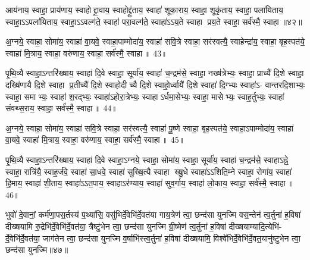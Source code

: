 {\anuvakamend[{रन्ति॒स्स्वाहा॒ द्वाविꣳ॑शतिश्च॥12॥}]}

आय॑नाय॒ स्वाहा॒ प्राय॑णाय॒ स्वाहोद्द्रा॒वाय॒ स्वाहोद्द्रु॑ताय॒ स्वाहा॑ शूका॒राय॒ स्वाहा॒ शूकृ॑ताय॒ स्वाहा॒ पला॑यिताय॒ स्वाहा॒ऽऽपला॑यिताय॒ स्वाहा॒ऽऽवल्ग॑ते॒ स्वाहा॑ परा॒वल्ग॑ते॒ स्वाहा॑ऽऽय॒ते स्वाहा प्रय॒ते स्वाहा॒ सर्व॑स्मै॒ स्वाहा॥४२॥

{\anuvakamend[{आय॑ना॒योत्त॑रमा॒पला॑यिताय॒ षड्विꣳ॑शतिः॥13॥}]}

अ॒ग्नये॒ स्वाहा॒ सोमा॑य॒ स्वाहा॑ वा॒यवे॒ स्वाहा॒पाम्मोदा॑य॒ स्वाहा॑ सवि॒त्रे स्वाहा॒ सर॑स्वत्यै॒ स्वाहेन्द्रा॑य॒ स्वाहा॒ बृह॒स्पत॑ये॒ स्वाहा॑ मि॒त्राय॒ स्वाहा॒ वरु॑णाय॒ स्वाहा॒ सर्व॑स्मै॒ स्वाहा॥ 43॥

{\anuvakamend[{}]}

पृ॒थि॒व्यै स्वाहा॒ऽन्तरि॑ख्षाय॒ स्वाहा॑ दि॒वे स्वाहा॒ सूर्या॑य॒ स्वाहा॑ च॒न्द्रम॑से॒ स्वाहा॒ नख्ष॑त्रेभ्यः॒ स्वाहा॒ प्राच्यै॑ दि॒शे स्वाहा॒ दख्षि॑णायै दि॒शे स्वाहा प्र॒तीच्यै॑ दि॒शे स्वाहोदीच्यै दि॒शे स्वाहो॒र्ध्वायै॑ दि॒शे स्वाहा॑ दि॒ग्भ्यः स्वाहा॑ऽ- वान्तरदि॒शाभ्यः॒ स्वाहा॒ समाभ्यः॒ स्वाहा॑ श॒रद्भ्यः॒ स्वाहा॑ऽहोरा॒त्रेभ्यः॒ स्वाहाऽर्धमा॒सेभ्यः॒ स्वाहा॒ मासेभ्यः॒ स्वाह॒र्तुभ्यः॒ स्वाहा॑ संवथ्स॒राय॒ स्वाहा॒ सर्व॑स्मै॒ स्वाहा॥ 44॥

{\anuvakamend[{}]}

अ॒ग्नये॒ स्वाहा॒ सोमा॑य॒ स्वाहा॑ सवि॒त्रे स्वाहा॒ सर॑स्वत्यै॒ स्वाहा॑ पू॒ष्णे स्वाहा॒ बृह॒स्पत॑ये॒ स्वाहा॒ऽपाम्मोदा॑य॒ स्वाहा॑ वा॒यवे॒ स्वाहा॑ मि॒त्राय॒ स्वाहा॒ वरु॑णाय॒ स्वाहा॒ सर्व॑स्मै॒ स्वाहा॥ 45॥

{\anuvakamend[{}]}

पृ॒थि॒व्यै स्वाहा॒ऽन्तरि॑ख्षाय॒ स्वाहा॑ दि॒वे स्वाहा॒ऽग्नये॒ स्वाहा॒ सोमा॑य॒ स्वाहा॒ सूर्या॑य॒ स्वाहा॑ च॒न्द्रम॑से॒ स्वाहाऽह्ने॒ स्वाहा॒ रात्रि॑यै॒ स्वाह॒र्जवे॒ स्वाहा॑ सा॒धवे॒ स्वाहा॑ सुख्षि॒त्यै स्वाहा ख्षु॒धे स्वाहा॑ऽऽशिति॒म्ने स्वाहा॒ रोगा॑य॒ स्वाहा॑ हि॒माय॒ स्वाहा॑ शी॒ताय॒ स्वाहा॑ऽऽत॒पाय॒ स्वाहाऽर॑ण्याय॒ स्वाहा॑ सुव॒र्गाय॒ स्वाहा॑ लो॒काय॒ स्वाहा॒ सर्व॑स्मै॒ स्वाहा॥ 46॥

{\anuvakamend[{}]}

भुवो॑ दे॒वानां॒ कर्म॑णा॒पस॒र्तस्य॑ प॒थ्या॑सि॒ वसु॑भिर्दे॒वेभि॑र्दे॒वत॑या गाय॒त्रेण॑ त्वा॒ छन्द॑सा युनज्मि वस॒न्तेन॑ त्व॒र्तुना॑ ह॒विषा॑ दीख्षयामि रु॒द्रेभि॑र्दे॒वेभि॑र्दे॒वत॑या॒ त्रैष्टु॑भेन त्वा॒ छन्द॑सा युनज्मि ग्री॒ष्मेण॑ त्व॒र्तुना॑ ह॒विषा॑ दीख्षयाम्यादि॒त्येभि॑- र्दे॒वेभि॑र्दे॒वत॑या॒ जाग॑तेन त्वा॒ छन्द॑सा युनज्मि व॒र्\mbox{}षाभि॑स्त्व॒र्तुना॑ ह॒विषा॑ दीख्षयामि॒ विश्वे॑भिर्दे॒वेभि॑र्दे॒वत॒यानु॑ष्टुभेन त्वा॒ छन्द॑सा युनज्मि॥४७॥

